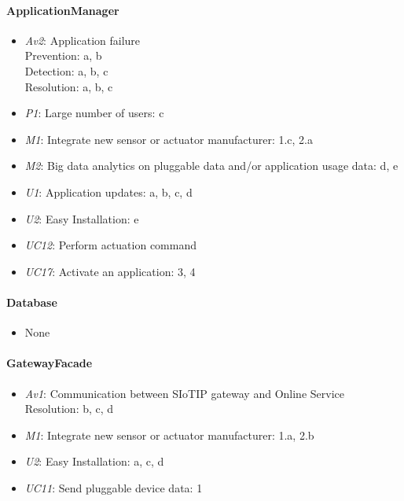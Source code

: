     \paragraph{ApplicationManager}
        \begin{itemize}
            \item \emph{Av2}: Application failure \\
                   Prevention: a, b \\
                   Detection: a, b, c \\
                   Resolution: a, b, c
           \item \emph{P1}: Large number of users: c
           \item \emph{M1}: Integrate new sensor or actuator manufacturer: 1.c, 2.a
           \item \emph{M2}: Big data analytics on pluggable data and/or application usage data: d, e
           \item \emph{U1}: Application updates: a, b, c, d
           \item \emph{U2}: Easy Installation: e
           \item \emph{UC12}: Perform actuation command
           \item \emph{UC17}: Activate an application: 3, 4
        \end{itemize}

    \paragraph{Database}
        \begin{itemize}
          	\item None
        \end{itemize}

    \paragraph{GatewayFacade}
        \begin{itemize}
            \item \emph{Av1}: Communication between SIoTIP gateway and Online Service \\
                               Resolution: b, c, d
            \item \emph{M1}: Integrate new sensor or actuator manufacturer: 1.a, 2.b
            \item \emph{U2}: Easy Installation: a, c, d
            \item \emph{UC11}: Send pluggable device data: 1
        \end{itemize}

